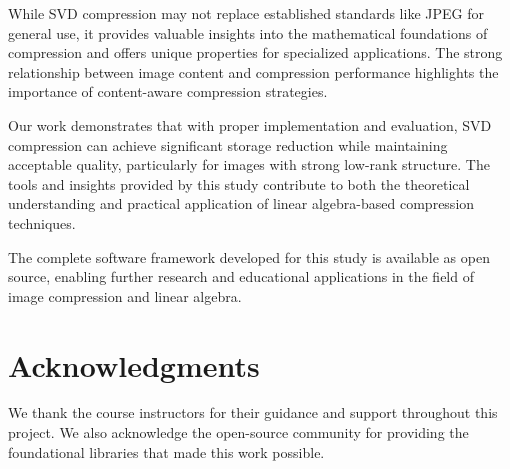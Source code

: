 \documentclass[12pt,a4paper]{article}
\begin{document}
While SVD compression may not replace established standards like JPEG for general use, it provides valuable insights into the mathematical foundations of compression and offers unique properties for specialized applications. The strong relationship between image content and compression performance highlights the importance of content-aware compression strategies.

Our work demonstrates that with proper implementation and evaluation, SVD compression can achieve significant storage reduction while maintaining acceptable quality, particularly for images with strong low-rank structure. The tools and insights provided by this study contribute to both the theoretical understanding and practical application of linear algebra-based compression techniques.

The complete software framework developed for this study is available as open source, enabling further research and educational applications in the field of image compression and linear algebra.

\section*{Acknowledgments}

We thank the course instructors for their guidance and support throughout this project. We also acknowledge the open-source community for providing the foundational libraries that made this work possible.
\end{document}
